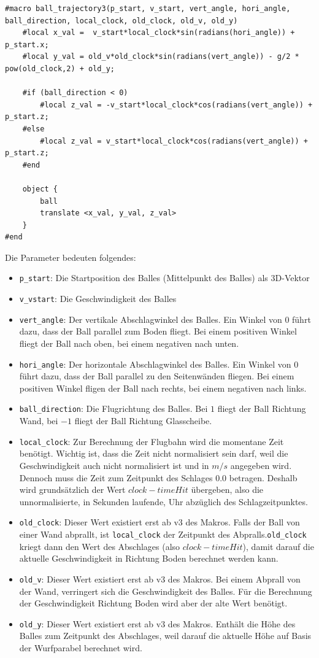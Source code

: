 \begin{lstlisting}[caption=Makro zur Generierung einer Flugbahn des Balles (verkürzt)]
#macro ball_trajectory3(p_start, v_start, vert_angle, hori_angle, ball_direction, local_clock, old_clock, old_v, old_y)
	#local x_val =  v_start*local_clock*sin(radians(hori_angle)) + p_start.x;
	#local y_val = old_v*old_clock*sin(radians(vert_angle)) - g/2 * pow(old_clock,2) + old_y;

	#if (ball_direction < 0)
		#local z_val = -v_start*local_clock*cos(radians(vert_angle)) + p_start.z;
	#else 
		#local z_val = v_start*local_clock*cos(radians(vert_angle)) + p_start.z;
	#end

	object {
		ball
		translate <x_val, y_val, z_val>
	}
#end
\end{lstlisting}
Die Parameter bedeuten folgendes:
\begin{itemize}
	\item \texttt{p\_start}: Die Startposition des Balles (Mittelpunkt des Balles) als 3D-Vektor
	\item \texttt{v\_vstart}: Die Geschwindigkeit des Balles
	\item \texttt{vert\_angle}: Der vertikale Abschlagwinkel des Balles. Ein Winkel von 0 führt dazu, dass der Ball parallel zum Boden fliegt. Bei einem positiven Winkel fliegt der Ball nach oben, bei einem negativen nach unten.
	\item \texttt{hori\_angle}: Der horizontale Abschlagwinkel des Balles. Ein Winkel von 0 führt dazu, dass der Ball parallel zu den Seitenwänden fliegen. Bei einem positiven Winkel fligen der Ball nach rechts, bei einem negativen nach links.
	\item \texttt{ball\_direction}: Die Flugrichtung des Balles. Bei $1$ fliegt der Ball Richtung Wand, bei $-1$ fliegt der Ball Richtung Glasscheibe.
	\item \texttt{local\_clock}: Zur Berechnung der Flugbahn wird die momentane Zeit benötigt. Wichtig ist, dass die Zeit nicht normalisiert sein darf, weil die Geschwindigkeit auch nicht normalisiert ist und in $m/s$ angegeben wird. Dennoch muss die Zeit zum Zeitpunkt des Schlages $0.0$ betragen. Deshalb wird grundsätzlich der Wert $clock - timeHit$ übergeben, also die unnormalisierte, in Sekunden laufende, Uhr abzüglich des Schlagzeitpunktes.
	\item \texttt{old\_clock}: Dieser Wert existiert erst ab v3 des Makros. Falls der Ball von einer Wand abprallt, ist \texttt{local\_clock} der Zeitpunkt des Abpralls.\texttt{old\_clock} kriegt dann den Wert des Abschlages (also $clock - timeHit$), damit darauf die aktuelle Geschwindigkeit in Richtung Boden berechnet werden kann. 
	\item \texttt{old\_v}: Dieser Wert existiert erst ab v3 des Makros. Bei einem Abprall von der Wand, verringert sich die Geschwindigkeit des Balles. Für die Berechnung der Geschwindigkeit Richtung Boden wird aber der alte Wert benötigt.
	\item \texttt{old\_y}: Dieser Wert existiert erst ab v3 des Makros. Enthält die Höhe des Balles zum Zeitpunkt des Abschlages, weil darauf die aktuelle Höhe auf Basis der Wurfparabel berechnet wird.
\end{itemize}


